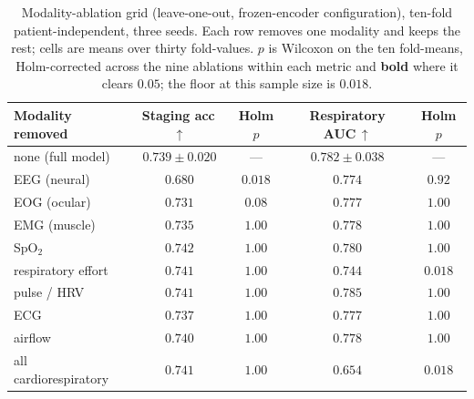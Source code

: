 \documentclass{ieeeaccess}
\begin{document}
\begin{table}[t]
\caption{Modality-ablation grid (leave-one-out, frozen-encoder configuration), ten-fold
patient-independent, three seeds. Each row removes one modality and keeps the rest; cells are means over
thirty fold-values. $p$ is Wilcoxon on the ten fold-means, Holm-corrected across the
nine ablations within each metric and \textbf{bold} where it clears $0.05$; the
floor at this sample size is $0.018$.}
\label{tab:ablate}
\centering
\setlength{\tabcolsep}{14pt}
\begin{tabular}{lcccc}
\toprule
Modality removed & Staging acc\,$\uparrow$ & Holm $p$ & Respiratory AUC\,$\uparrow$ & Holm $p$ \\
\midrule
 none (full model)        & $0.739 \pm 0.020$   & ---                 & $0.782 \pm 0.038$   & --- \\
 EEG (neural)             & $0.680$             & $\mathbf{0.018}$    & $0.774$             & $0.92$ \\
 EOG (ocular)             & $0.731$             & $0.08$              & $0.777$             & $1.00$ \\
 EMG (muscle)             & $0.735$             & $1.00$              & $0.778$             & $1.00$ \\
 SpO$_2$                  & $0.742$             & $1.00$              & $0.780$             & $1.00$ \\
 respiratory effort       & $0.741$             & $1.00$              & $0.744$             & $\mathbf{0.018}$ \\
 pulse / HRV              & $0.741$             & $1.00$              & $0.785$             & $1.00$ \\
 ECG                      & $0.737$             & $1.00$              & $0.777$             & $1.00$ \\
 airflow                  & $0.740$             & $1.00$              & $0.778$             & $1.00$ \\
 all cardiorespiratory    & $0.741$             & $1.00$              & $0.654$             & $\mathbf{0.018}$ \\
\bottomrule
\end{tabular}
\end{table}
\end{document}
